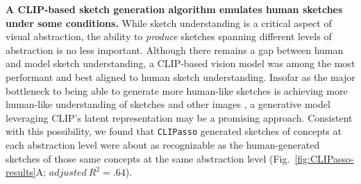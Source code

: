 \documentclass{article}
\begin{document}


\textbf{A CLIP-based sketch generation algorithm emulates human sketches under some conditions.}
While sketch understanding is a critical aspect of visual abstraction, the ability to \textit{produce} sketches spanning different levels of abstraction is no less important.
Although there remains a gap between human and model sketch understanding, a CLIP-based vision model \cite{radford2021learning} was among the most performant and best aligned to human sketch understanding. 
Insofar as the major bottleneck to being able to generate more human-like sketches is achieving more human-like understanding of sketches and other images \cite{fan2018common}, a generative model leveraging CLIP's latent representation may be a promising approach. %
Consistent with this possibility, we found that \texttt{CLIPasso} generated sketches of concepts at each abstraction level were about as recognizable as the human-generated sketches of those same concepts at the same abstraction level (Fig.~\ref{fig:CLIPasso-results}A; $adjusted \: R^2 = .64$).
\end{document}
